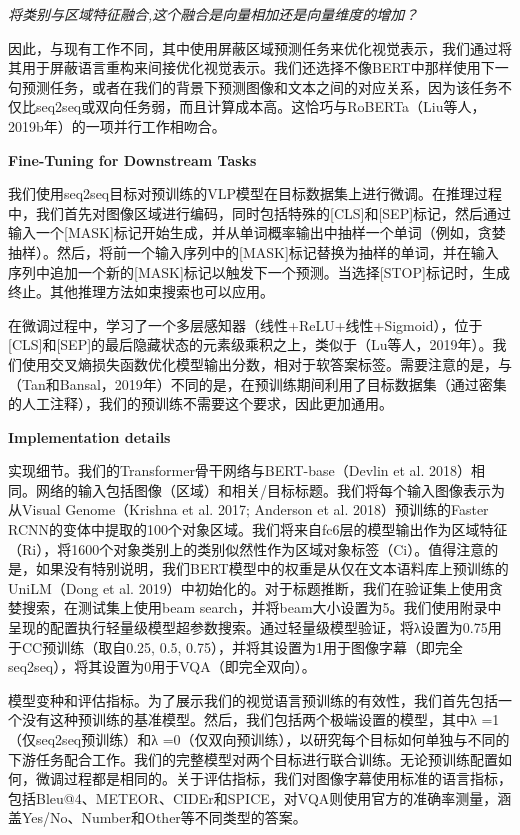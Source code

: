 \documentclass{article}
\begin{document}
\begin{sloppypar}
      \textit{将类别与区域特征融合,这个融合是向量相加还是向量维度的增加？}

      因此，与现有工作不同，其中使用屏蔽区域预测任务来优化视觉表示，我们通过将其用于屏蔽语言重构来间接优化视觉表示。我们还选择不像BERT中那样使用下一句预测任务，或者在我们的背景下预测图像和文本之间的对应关系，因为该任务不仅比seq2seq或双向任务弱，而且计算成本高。这恰巧与RoBERTa（Liu等人，2019b年）的一项并行工作相吻合。


      \centerline{\textbf{Fine-Tuning for Downstream Tasks}}

      我们使用seq2seq目标对预训练的VLP模型在目标数据集上进行微调。在推理过程中，我们首先对图像区域进行编码，同时包括特殊的[CLS]和[SEP]标记，然后通过输入一个[MASK]标记开始生成，并从单词概率输出中抽样一个单词（例如，贪婪抽样）。然后，将前一个输入序列中的[MASK]标记替换为抽样的单词，并在输入序列中追加一个新的[MASK]标记以触发下一个预测。当选择[STOP]标记时，生成终止。其他推理方法如束搜索也可以应用。

      在微调过程中，学习了一个多层感知器（线性+ReLU+线性+Sigmoid），位于[CLS]和[SEP]的最后隐藏状态的元素级乘积之上，类似于（Lu等人，2019年）。我们使用交叉熵损失函数优化模型输出分数，相对于软答案标签。需要注意的是，与（Tan和Bansal，2019年）不同的是，在预训练期间利用了目标数据集（通过密集的人工注释），我们的预训练不需要这个要求，因此更加通用。

      \centerline{\textbf{Implementation details}}

      实现细节。我们的Transformer骨干网络与BERT-base（Devlin et al. 2018）相同。网络的输入包括图像（区域）和相关/目标标题。我们将每个输入图像表示为从Visual Genome（Krishna et al. 2017; Anderson et al. 2018）预训练的Faster RCNN的变体中提取的100个对象区域。我们将来自fc6层的模型输出作为区域特征（Ri），将1600个对象类别上的类别似然性作为区域对象标签（Ci）。值得注意的是，如果没有特别说明，我们BERT模型中的权重是从仅在文本语料库上预训练的UniLM（Dong et al. 2019）中初始化的。对于标题推断，我们在验证集上使用贪婪搜索，在测试集上使用beam search，并将beam大小设置为5。我们使用附录中呈现的配置执行轻量级模型超参数搜索。通过轻量级模型验证，将λ设置为0.75用于CC预训练（取自{0.25, 0.5, 0.75}），并将其设置为1用于图像字幕（即完全seq2seq），将其设置为0用于VQA（即完全双向）。

      模型变种和评估指标。为了展示我们的视觉语言预训练的有效性，我们首先包括一个没有这种预训练的基准模型。然后，我们包括两个极端设置的模型，其中λ =1（仅seq2seq预训练）和λ =0（仅双向预训练），以研究每个目标如何单独与不同的下游任务配合工作。我们的完整模型对两个目标进行联合训练。无论预训练配置如何，微调过程都是相同的。关于评估指标，我们对图像字幕使用标准的语言指标，包括Bleu@4、METEOR、CIDEr和SPICE，对VQA则使用官方的准确率测量，涵盖Yes/No、Number和Other等不同类型的答案。


\end{sloppypar}
\end{document}
